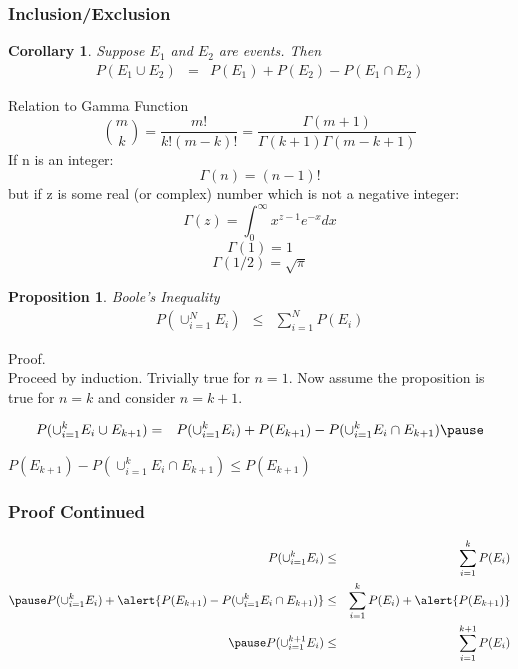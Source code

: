 \documentclass[handout]{beamer}
\newtheorem{prop}{Proposition}
\newtheorem{cor}{Corollary}
\numberwithin{equation}{section}
\begin{document}
\begin{frame}
\frametitle{Inclusion/Exclusion}


\begin{cor}
Suppose $E_{1}$ and $E_{2} $ are events.  Then 
\begin{eqnarray}
P(E_{1} \cup E_{2} ) & = & P(E_{1} ) + P(E_{2} ) - P(E_{1} \cap E_{2} ) \nonumber 
\end{eqnarray}
\end{cor}


\end{frame}


\begin{frame}{Relation to Gamma Function}
$${{m}\choose{k}}=\frac{m!}{k!(m-k)!}=\frac{\Gamma(m+1)}{\Gamma(k+1)\Gamma(m-k+1)}$$
If n is an integer:
$$\Gamma(n)=(n-1)!$$
but if z is some real (or complex) number which is not a negative integer:
$$\Gamma(z)=\int_0^\infty x^{z-1}e^{-x}dx$$
$$\Gamma(1)=1$$
$$\Gamma(1/2)=\sqrt{\pi}$$

\end{frame}

\begin{frame}

\begin{prop}
\alert{Boole's Inequality}
\begin{eqnarray}
P(\cup_{i=1}^{N} E_{i}) & \leq & \sum_{i=1}^{N} P(E_{i} ) \nonumber 
\end{eqnarray}

\end{prop}
\pause 
Proof. \pause \\
Proceed by induction.  Trivially true for $n =1 $.  Now assume the proposition is true for $n = k$ and consider $n = k + 1$.  \pause 

\begin{eqnarray}
P(\cup_{i=1}^{k} E_i \cup E_{k + 1} )  & = & P(\cup_{i=1}^{k} E_i) + P(E_{k + 1} ) - P(\cup_{i=1}^{k} E_i \cap E_{k + 1})\nonumber  \pause 
\end{eqnarray}

$P(E_{k + 1} ) - P(\cup_{i=1}^{k} E_i \cap E_{k + 1}) \leq P(E_{k + 1} )$\\ 


\end{frame}

\begin{frame}
\frametitle{Proof Continued}

\begin{eqnarray}
P(\cup_{i=1}^{k} E_i ) & \leq  & \sum_{i=1}^{k} P(E_{i} ) \nonumber \\ \pause 
P(\cup_{i=1}^{k} E_i) + \alert{P(E_{k + 1} ) - P(\cup_{i=1}^{k} E_i \cap E_{k + 1})} & \leq & 
\sum_{i=1}^{k} P(E_{i} ) + \alert{P(E_{k + 1} )} \nonumber \\ \pause 
P(\cup_{i=1}^{k + 1} E_i) & \leq & \sum_{i=1}^{k + 1} P(E_{i} )\nonumber 
\end{eqnarray}



\end{frame}
\end{document}
